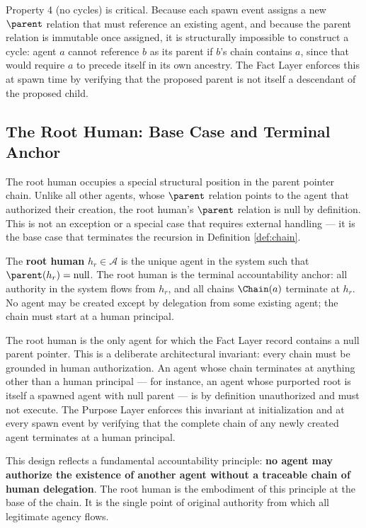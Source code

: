 Property 4 (no cycles) is critical. Because each spawn event assigns a new $\parent$ relation that must reference an existing agent, and because the parent relation is immutable once assigned, it is structurally impossible to construct a cycle: agent $a$ cannot reference $b$ as its parent if $b$'s chain contains $a$, since that would require $a$ to precede itself in its own ancestry. The Fact Layer enforces this at spawn time by verifying that the proposed parent is not itself a descendant of the proposed child.

\subsection{The Root Human: Base Case and Terminal Anchor}

The root human occupies a special structural position in the parent pointer chain. Unlike all other agents, whose $\parent$ relation points to the agent that authorized their creation, the root human's $\parent$ relation is null by definition. This is not an exception or a special case that requires external handling — it is the base case that terminates the recursion in Definition \ref{def:chain}.

\begin{definition}
\label{def:root_human}
The \textbf{root human} $h_r \in \mathcal{A}$ is the unique agent in the system such that $\parent(h_r) = \text{null}$. The root human is the terminal accountability anchor: all authority in the system flows from $h_r$, and all chains $\Chain(a)$ terminate at $h_r$. No agent may be created except by delegation from some existing agent; the chain must start at a human principal.
\end{definition}

The root human is the only agent for which the Fact Layer record contains a null parent pointer. This is a deliberate architectural invariant: every chain must be grounded in human authorization. An agent whose chain terminates at anything other than a human principal — for instance, an agent whose purported root is itself a spawned agent with null parent — is by definition unauthorized and must not execute. The Purpose Layer enforces this invariant at initialization and at every spawn event by verifying that the complete chain of any newly created agent terminates at a human principal.

This design reflects a fundamental accountability principle: \textbf{no agent may authorize the existence of another agent without a traceable chain of human delegation}. The root human is the embodiment of this principle at the base of the chain. It is the single point of original authority from which all legitimate agency flows.

